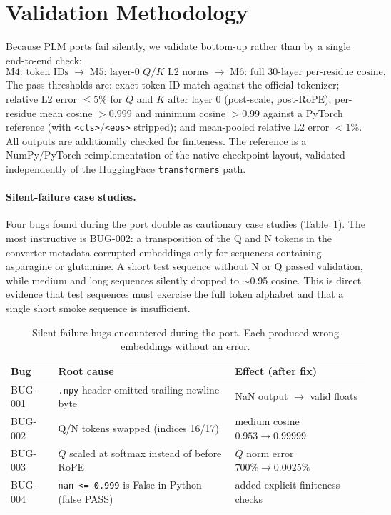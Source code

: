 \documentclass{article}
\begin{document}
\section{Validation Methodology}
\label{sec:validation}

Because PLM ports fail silently, we validate bottom-up rather than by a single end-to-end check:
\[
\text{M4: token IDs} \;\to\; \text{M5: layer-0 } Q/K \text{ L2 norms} \;\to\; \text{M6: full 30-layer per-residue cosine}.
\]
The pass thresholds are: exact token-ID match against the official tokenizer; relative L2 error $\le 5\%$ for $Q$ and $K$ after layer 0 (post-scale, post-RoPE); per-residue mean cosine $>0.999$ and minimum cosine $>0.99$ against a PyTorch reference (with \texttt{<cls>}/\texttt{<eos>} stripped); and mean-pooled relative L2 error $<1\%$. All outputs are additionally checked for finiteness. The reference is a NumPy/PyTorch reimplementation of the native checkpoint layout, validated independently of the HuggingFace \texttt{transformers} path.

\paragraph{Silent-failure case studies.}
Four bugs found during the port double as cautionary case studies (Table~\ref{tab:bugs}). The most instructive is BUG-002: a transposition of the Q and N tokens in the converter metadata corrupted embeddings only for sequences containing asparagine or glutamine. A short test sequence without N or Q passed validation, while medium and long sequences silently dropped to $\sim$0.95 cosine. This is direct evidence that test sequences must exercise the full token alphabet and that a single short smoke sequence is insufficient.

\begin{table}
  \caption{Silent-failure bugs encountered during the port. Each produced wrong embeddings without an error.}
  \label{tab:bugs}
  \centering
  \begin{tabular}{lll}
    \toprule
    Bug & Root cause & Effect (after fix) \\
    \midrule
    BUG-001 & \texttt{.npy} header omitted trailing newline byte & NaN output $\to$ valid floats \\
    BUG-002 & Q/N tokens swapped (indices 16/17) & medium cosine $0.953 \to 0.99999$ \\
    BUG-003 & $Q$ scaled at softmax instead of before RoPE & $Q$ norm error $700\% \to 0.0025\%$ \\
    BUG-004 & \texttt{nan <= 0.999} is False in Python (false PASS) & added explicit finiteness checks \\
    \bottomrule
  \end{tabular}
\end{table}
\end{document}
